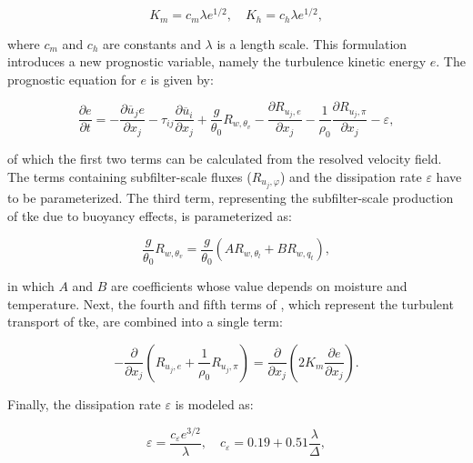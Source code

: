 \begin{equation}
    K_m = c_m \lambda e^{1/2}, \quad K_h = c_h \lambda e^{1/2},
\end{equation}

where $c_m$ and $c_h$ are constants and $\lambda$ is a length scale. This formulation introduces a new prognostic variable, namely the turbulence kinetic energy $e$. The prognostic equation for $e$ is given by:

\begin{equation}
    \frac{\partial e}{\partial t} = - \frac{\partial \overline{u}_j e}{\partial x_j} - \tau_{ij} \frac{\partial \overline{u}_i}{\partial x_j} + \frac{g}{\theta_0} R_{w,\theta_v} - \frac{\partial R_{u_j,e}}{\partial x_j} - \frac{1}{\rho_0} \frac{\partial R_{u_j,\pi}}{\partial x_j} - \varepsilon,
    \label{eq:deardorff_tke}
\end{equation}

of which the first two terms can be calculated from the resolved velocity field. The terms containing subfilter-scale fluxes ($R_{u_j,\varphi}$) and the dissipation rate $\varepsilon$ have to be parameterized. The third term, representing the subfilter-scale production of \acrshort{tke} due to buoyancy effects, is parameterized as:

\begin{equation}
    \frac{g}{\theta_0} R_{w,\theta_v} = \frac{g}{\theta_0} \left( A R_{w,\theta_l} + B R_{w,q_t}\right),
    \label{eq:sfs_buoy}
\end{equation}

in which $A$ and $B$ are coefficients whose value depends on moisture and temperature. Next, the fourth and fifth terms of , which represent the turbulent transport of \acrshort{tke}, are combined into a single term:

\begin{equation}
    - \frac{\partial}{\partial x_j} \left( R_{u_j,e} + \frac{1}{\rho_0} R_{u_j,\pi} \right) = \frac{\partial}{\partial x_j} \left( 2 K_m \frac{\partial e}{\partial x_j} \right).
    \label{eq:sfs_turb}
\end{equation}

Finally, the dissipation rate $\varepsilon$ is modeled as:

\begin{equation}
    \varepsilon = \frac{c_{\varepsilon}e^{3/2}}{\lambda}, \quad c_\varepsilon = 0.19 + 0.51 \frac{\lambda}{\Delta},
    \label{eq:sfs_diss}
\end{equation}

